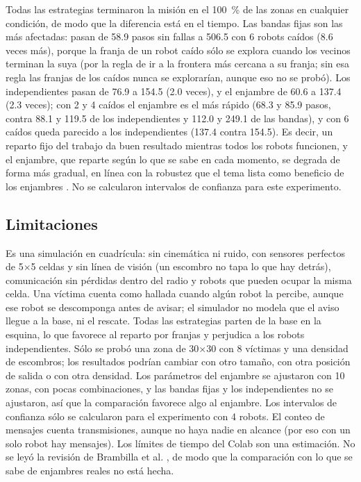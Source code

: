 \documentclass[11pt,letterpaper]{article}
\begin{document}
Todas las estrategias terminaron la misión en el 100~\% de las zonas en cualquier condición, de modo que la diferencia está en el tiempo. Las bandas fijas son las más afectadas: pasan de 58.9 pasos sin fallas a 506.5 con 6 robots caídos (8.6 veces más), porque la franja de un robot caído sólo se explora cuando los vecinos terminan la suya (por la regla de ir a la frontera más cercana a su franja; sin esa regla las franjas de los caídos nunca se explorarían, aunque eso no se probó). Los independientes pasan de 76.9 a 154.5 (2.0 veces), y el enjambre de 60.6 a 137.4 (2.3 veces); con 2 y 4 caídos el enjambre es el más rápido (68.3 y 85.9 pasos, contra 88.1 y 119.5 de los independientes y 112.0 y 249.1 de las bandas), y con 6 caídos queda parecido a los independientes (137.4 contra 154.5). Es decir, un reparto fijo del trabajo da buen resultado mientras todos los robots funcionen, y el enjambre, que reparte según lo que se sabe en cada momento, se degrada de forma más gradual, en línea con la robustez que el tema lista como beneficio de los enjambres \parencite{iae_u4_t46}. No se calcularon intervalos de confianza para este experimento.

\subsection{Limitaciones}

Es una simulación en cuadrícula: sin cinemática ni ruido, con sensores perfectos de 5$\times$5 celdas y sin línea de visión (un escombro no tapa lo que hay detrás), comunicación sin pérdidas dentro del radio y robots que pueden ocupar la misma celda. Una víctima cuenta como hallada cuando algún robot la percibe, aunque ese robot se descomponga antes de avisar; el simulador no modela que el aviso llegue a la base, ni el rescate. Todas las estrategias parten de la base en la esquina, lo que favorece al reparto por franjas y perjudica a los robots independientes. Sólo se probó una zona de 30$\times$30 con 8 víctimas y una densidad de escombros; los resultados podrían cambiar con otro tamaño, con otra posición de salida o con otra densidad. Los parámetros del enjambre se ajustaron con 10 zonas, con pocas combinaciones, y las bandas fijas y los independientes no se ajustaron, así que la comparación favorece algo al enjambre. Los intervalos de confianza sólo se calcularon para el experimento con 4 robots. El conteo de mensajes cuenta transmisiones, aunque no haya nadie en alcance (por eso con un solo robot hay mensajes). Los límites de tiempo del Colab son una estimación. No se leyó la revisión de Brambilla et al. \parencite{brambilla2013}, de modo que la comparación con lo que se sabe de enjambres reales no está hecha.
\end{document}
